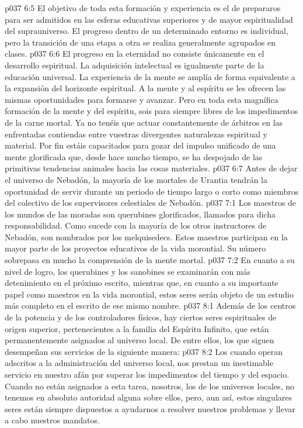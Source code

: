 \vs p037 6:5 \pc El objetivo de toda esta formación y experiencia es el de prepararos para ser admitidos en las esferas educativas superiores y de mayor espiritualidad del suprauniverso. El progreso dentro de un determinado entorno es individual, pero la transición de una etapa a otra se realiza generalmente agrupados en clases.
\vs p037 6:6 El progreso en la eternidad no consiste únicamente en el desarrollo espiritual. La adquisición intelectual es igualmente parte de la educación universal. La experiencia de la mente se amplía de forma equivalente a la expansión del horizonte espiritual. A la mente y al espíritu se les ofrecen las mismas oportunidades para formarse y avanzar. Pero en toda esta magnífica formación de la mente y del espíritu, sois para siempre libres de los impedimentos de la carne mortal. Ya no tenéis que actuar constantemente de árbitros en las enfrentadas contiendas entre vuestras divergentes naturalezas espiritual y material. Por fin estáis capacitados para gozar del impulso unificado de una mente glorificada que, desde hace mucho tiempo, se ha despojado de las primitivas tendencias animales hacia las cosas materiales.
\vs p037 6:7 \pc Antes de dejar el universo de Nebadón, la mayoría de los mortales de Urantia tendrán la oportunidad de servir durante un periodo de tiempo largo o corto como miembros del colectivo de los supervisores celestiales de Nebadón.
\vs p037 7:1 Los maestros de los mundos de las moradas son querubines glorificados, llamados para dicha responsabilidad. Como sucede con la mayoría de los otros instructores de Nebadón, son nombrados por los melquisedecs. Estos maestros participan en la mayor parte de los proyectos educativos de la vida morontial. Su número sobrepasa en mucho la comprensión de la mente mortal.
\vs p037 7:2 En cuanto a su nivel de logro, los querubines y los sanobines se examinarán con más detenimiento en el próximo escrito, mientras que, en cuanto a su importante papel como maestros en la vida morontial, estos seres serán objeto de un estudio más completo en el escrito de ese mismo nombre.
\vs p037 8:1 Además de los centros de la potencia y de los controladores físicos, hay ciertos seres espirituales de origen superior, pertenecientes a la familia del Espíritu Infinito, que están permanentemente asignados al universo local. De entre ellos, los que siguen desempeñan sus servicios de la siguiente manera:
\vs p037 8:2 \pc Los  cuando operan adscritos a la administración del universo local, nos prestan un inestimable servicio en nuestro afán por superar los impedimentos del tiempo y del espacio. Cuando no están asignados a esta tarea, nosotros, los de los universos locales, no tenemos en absoluto autoridad alguna sobre ellos, pero, aun así, estos singulares seres están siempre dispuestos a ayudarnos a resolver nuestros problemas y llevar a cabo nuestros mandatos.

